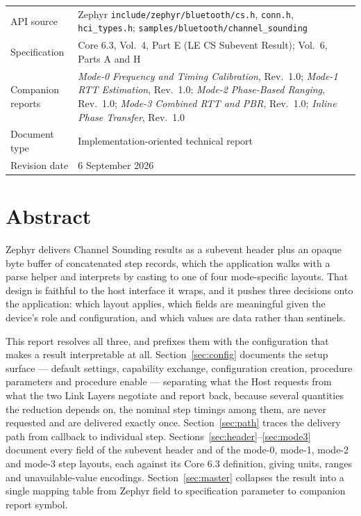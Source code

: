 \documentclass[11pt,a4paper]{article}
\newcommand{\code}[1]{\texttt{\small #1}}
\begin{document}
\vfill
\noindent
\begin{tabular}{@{}L{42mm}L{100mm}@{}}
API source & Zephyr \code{include/zephyr/bluetooth/cs.h}, \code{conn.h}, \code{hci\_\allowbreak{}types.h};
             \code{samples/bluetooth/channel\_\allowbreak{}sounding} \\
Specification & Core 6.3, Vol.\ 4, Part E (LE CS Subevent Result); Vol.\ 6, Parts A and H \\
Companion reports & \emph{Mode-0 Frequency and Timing Calibration}, Rev.\ 1.0;
                    \emph{Mode-1 RTT Estimation}, Rev.\ 1.0;
                    \emph{Mode-2 Phase-Based Ranging}, Rev.\ 1.0;
                    \emph{Mode-3 Combined RTT and PBR}, Rev.\ 1.0;
                    \emph{Inline Phase Transfer}, Rev.\ 1.0 \\
Document type & Implementation-oriented technical report \\
Revision date & 6 September 2026 \\
\end{tabular}

\newpage
{}
\section*{Abstract}

Zephyr delivers Channel Sounding results as a subevent header plus an opaque byte buffer of
concatenated step records, which the application walks with a parse helper and interprets by casting
to one of four mode-specific layouts. That design is faithful to the host interface it wraps, and it
pushes three decisions onto the application: which layout applies, which fields are meaningful given
the device's role and configuration, and which values are data rather than sentinels.

This report resolves all three, and prefixes them with the configuration that makes a result
interpretable at all. Section~\ref{sec:config} documents the setup surface --- default settings,
capability exchange, configuration creation, procedure parameters and procedure enable --- separating
what the Host requests from what the two Link Layers negotiate and report back, because several
quantities the reduction depends on, the nominal step timings among them, are never requested and are
delivered exactly once. Section~\ref{sec:path} traces the delivery path from callback to
individual step. Sections~\ref{sec:header}--\ref{sec:mode3} document every field of the subevent
header and of the mode-0, mode-1, mode-2 and mode-3 step layouts, each against its Core 6.3
definition, giving units, ranges and unavailable-value encodings. Section~\ref{sec:master} collapses
the result into a single mapping table from Zephyr field to specification parameter to companion
report symbol.
\end{document}
